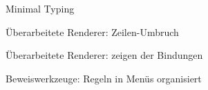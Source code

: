 {
  \begin{itemgroup}{Minimal Typing}
    \item Überarbeitete Renderer: Zeilen-Umbruch
    \item Überarbeitete Renderer: zeigen der Bindungen
    \item Beweiswerkzeuge: Regeln in Menüs organisiert
  \end{itemgroup}
}
